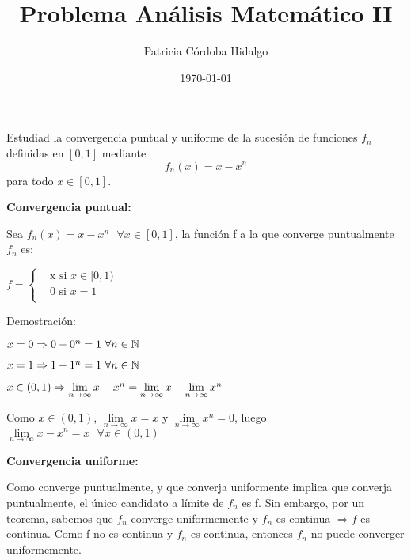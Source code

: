 \documentclass{article}
\begin{document}
\title{Problema Análisis Matemático II}
\author{Patricia Córdoba Hidalgo}
\date{\today}

\maketitle

Estudiad la convergencia puntual y uniforme de la sucesión de funciones $f_n$ definidas en $[0,1]$ mediante $$f_n(x) = x-x^n$$ para todo $x\in [0,1]$.

\textbf{Convergencia puntual:}

Sea $f_n(x) = x - x^n \text{ }\forall x \in [0,1] $, la función f a la que converge puntualmente ${f_n}$ es:

$f=\begin{cases}
 & \text{x si } x \in [0,1) \\
 & \text{0 si } x = 1 \\
\end{cases}$

Demostración:

$x=0 \Rightarrow 0 - 0^n = 1 \text{ }\forall n \in \mathbb{N} \\$

$x=1 \Rightarrow 1 - 1^n = 1 \text{ }\forall n \in \mathbb{N} \\$

$x \in (0,1) \Rightarrow  \lim\limits_{n\to\infty}x - x^n = \lim\limits_{n\to\infty}x - \lim\limits_{n\to\infty}x^n \\$

Como $x \in (0,1)$, $\lim\limits_{n\to\infty}x = x$ \text{   }y $\lim\limits_{n\to\infty}x^n=0$, luego $\lim\limits_{n\to\infty}x - x^n = x  \text{ }\forall x \in (0,1)$

\textbf{Convergencia uniforme:}

Como converge puntualmente, y que converja uniformente implica que converja puntualmente, el único candidato a límite de ${f_n}$ es f. Sin embargo, por un teorema, sabemos que ${f_n}$ converge uniformemente y $f_n$ es continua $\Rightarrow f$ es continua. Como f no es continua y $f_n$ es continua, entonces ${f_n}$ no puede converger uniformemente.
\end{document}
